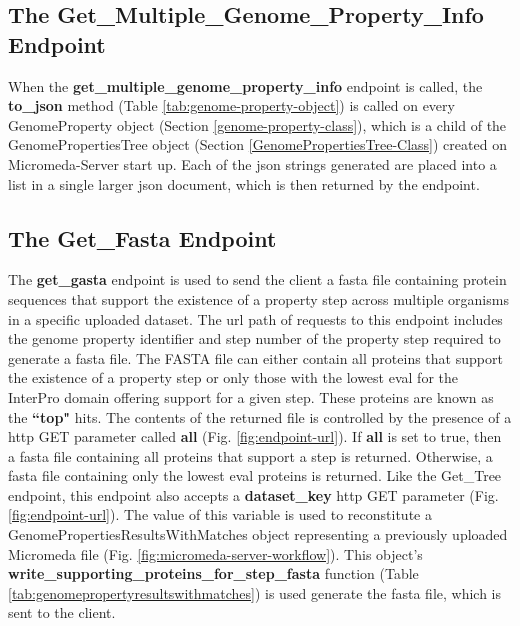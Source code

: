 \subsection{The Get\_Multiple\_Genome\_Property\_Info Endpoint}

When the \textbf{get\_multiple\_genome\_property\_info} endpoint is called, the 
\textbf{to\_json} method (Table \ref{tab:genome-property-object}) is called on 
every GenomeProperty object (Section \ref{genome-property-class}), which is a 
child of the GenomePropertiesTree object (Section 
\ref{GenomePropertiesTree-Class}) created on Micromeda-Server start up. Each of 
the \gls{json} strings generated are placed into a list in a single larger 
\gls{json} document, which is then returned by the endpoint. 

\subsection{The Get\_Fasta Endpoint} \label{get-fasta-endpoint}

The \textbf{get\_gasta} endpoint is used to send the client a \gls{fasta} file 
containing protein sequences that support the existence of a property step 
across multiple organisms in a specific uploaded dataset. The \gls{url} path of 
requests to this endpoint includes the genome property identifier and step 
number of the property step required to generate a \gls{fasta} file. The FASTA file 
can either contain all proteins that support the existence of a property step or 
only those with the lowest \gls{eval} for the InterPro domain offering support 
for a given step. These proteins are known as the \textbf{``top"} hits. The 
contents of the returned file is controlled by the presence of a \gls{http} GET 
parameter called \textbf{all} (Fig. \ref{fig:endpoint-url}). If \textbf{all} is 
set to true, then a \gls{fasta} file containing all proteins that support a step is 
returned. Otherwise, a \gls{fasta} file containing only the lowest \gls{eval} proteins 
is returned. Like the Get\_Tree endpoint, this endpoint also accepts a 
\textbf{dataset\_key} \gls{http} GET parameter (Fig. \ref{fig:endpoint-url}). 
The value of this variable is used to reconstitute a 
GenomePropertiesResultsWithMatches object representing a previously uploaded 
Micromeda file (Fig. \ref{fig:micromeda-server-workflow}). This object's 
\textbf{write\_supporting\_proteins\_for\_step\_fasta} function (Table 
\ref{tab:genomepropertyresultswithmatches}) is used generate the \gls{fasta} file, 
which is sent to the client.

